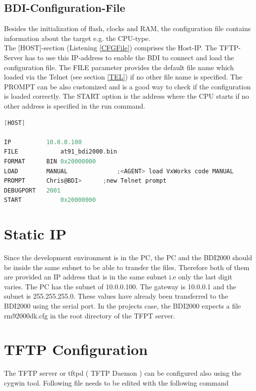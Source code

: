 \subsection{BDI-Configuration-File}
Besides the initialization of flash, clocks and \ac{RAM}, the configuration file contains information about the target e.g. the \ac{CPU}-type.\\
The [HOST]-section (Listening \ref{CFGFile}) comprises the Host-IP. The \ac{TFTP}-Server has to use this IP-address to enable the BDI to connect and load the configuration file. The FILE parameter provides the default file name which loaded via the Telnet (see section \ref{TEL}) if no other file name is specified. The PROMPT can be also customized and is a good way to check if the configuration is loaded correctly. The START option is the address where the \ac{CPU} starts if no other address is specified in the run command.\\
\begin{lstlisting}[language=C, caption={Extract of the rm9200dk.cfg-file}, label={CFGFile}]
[HOST]

IP          10.0.0.100
FILE	    	at91_bdi2000.bin	
FORMAT	    BIN 0x20000000
LOAD        MANUAL      		;<AGENT> load VxWorks code MANUAL
PROMPT      Chris@BDI>      ;new Telnet prompt
DEBUGPORT   2001
START	    	0x20000000
\end{lstlisting}

\section{Static IP} 
Since the development environment is in the PC, the PC and the BDI2000 should be inside the same subnet to be able to transfer the files. Therefore both of them are provided an IP address that is in the same subnet i.e only the last digit varies. The PC has the subnet of 10.0.0.100. The gateway is 10.0.0.1 and the subnet is 255.255.255.0. These values have already been transferred to the BDI2000 using the serial port. In the projects case, the BDI2000 expects a file rm92000dk.cfg in the root directory of the TFPT server. \\

\pagebreak

\section{TFTP Configuration}
The TFTP server or tftpd ( TFTP Daemon ) can be configured also using the cygwin tool. Following file needs to be edited with the following command \\
\\



